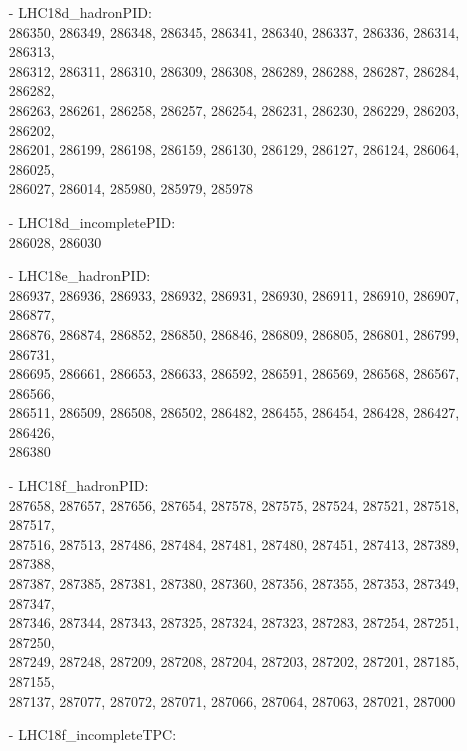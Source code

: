 \begin{appendix}
\vspace{\columnsep}
\begin{itemize}
    \small
    \item[] 
    \footnotesize
    \item[-] LHC18d\_hadronPID:\\[1pt]
     286350, 286349, 286348, 286345, 286341, 286340, 286337, 286336, 286314, 286313,\\
     286312, 286311, 286310, 286309, 286308, 286289, 286288, 286287, 286284, 286282,\\
     286263, 286261, 286258, 286257, 286254, 286231, 286230, 286229, 286203, 286202,\\
     286201, 286199, 286198, 286159, 286130, 286129, 286127, 286124, 286064, 286025,\\
     286027, 286014, 285980, 285979, 285978
    \item[-] LHC18d\_incompletePID:\\[1pt]
     286028, 286030
    \item[-] LHC18e\_hadronPID:\\[1pt]
     286937, 286936, 286933, 286932, 286931, 286930, 286911, 286910, 286907, 286877,\\
     286876, 286874, 286852, 286850, 286846, 286809, 286805, 286801, 286799, 286731,\\
     286695, 286661, 286653, 286633, 286592, 286591, 286569, 286568, 286567, 286566,\\
     286511, 286509, 286508, 286502, 286482, 286455, 286454, 286428, 286427, 286426,\\
     286380
    \item[-] LHC18f\_hadronPID:\\[1pt]
     287658, 287657, 287656, 287654, 287578, 287575, 287524, 287521, 287518, 287517,\\
     287516, 287513, 287486, 287484, 287481, 287480, 287451, 287413, 287389, 287388,\\
     287387, 287385, 287381, 287380, 287360, 287356, 287355, 287353, 287349, 287347,\\
     287346, 287344, 287343, 287325, 287324, 287323, 287283, 287254, 287251, 287250,\\
     287249, 287248, 287209, 287208, 287204, 287203, 287202, 287201, 287185, 287155,\\
     287137, 287077, 287072, 287071, 287066, 287064, 287063, 287021, 287000
    \item[-] LHC18f\_incompleteTPC:\\[1pt]

\end{itemize}
\end{appendix}

